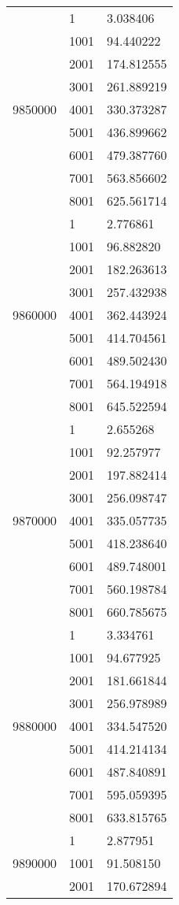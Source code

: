 \begin{table}[htb!]
\begin{tabular}{lll}
\multirow[c]{9}{*}{9850000} & 1 & 3.038406 \\
 & 1001 & 94.440222 \\
 & 2001 & 174.812555 \\
 & 3001 & 261.889219 \\
 & 4001 & 330.373287 \\
 & 5001 & 436.899662 \\
 & 6001 & 479.387760 \\
 & 7001 & 563.856602 \\
 & 8001 & 625.561714 \\
\multirow[c]{9}{*}{9860000} & 1 & 2.776861 \\
 & 1001 & 96.882820 \\
 & 2001 & 182.263613 \\
 & 3001 & 257.432938 \\
 & 4001 & 362.443924 \\
 & 5001 & 414.704561 \\
 & 6001 & 489.502430 \\
 & 7001 & 564.194918 \\
 & 8001 & 645.522594 \\
\multirow[c]{9}{*}{9870000} & 1 & 2.655268 \\
 & 1001 & 92.257977 \\
 & 2001 & 197.882414 \\
 & 3001 & 256.098747 \\
 & 4001 & 335.057735 \\
 & 5001 & 418.238640 \\
 & 6001 & 489.748001 \\
 & 7001 & 560.198784 \\
 & 8001 & 660.785675 \\
\multirow[c]{9}{*}{9880000} & 1 & 3.334761 \\
 & 1001 & 94.677925 \\
 & 2001 & 181.661844 \\
 & 3001 & 256.978989 \\
 & 4001 & 334.547520 \\
 & 5001 & 414.214134 \\
 & 6001 & 487.840891 \\
 & 7001 & 595.059395 \\
 & 8001 & 633.815765 \\
\multirow[c]{9}{*}{9890000} & 1 & 2.877951 \\
 & 1001 & 91.508150 \\
 & 2001 & 170.672894 \\

\end{tabular}
\end{table}
